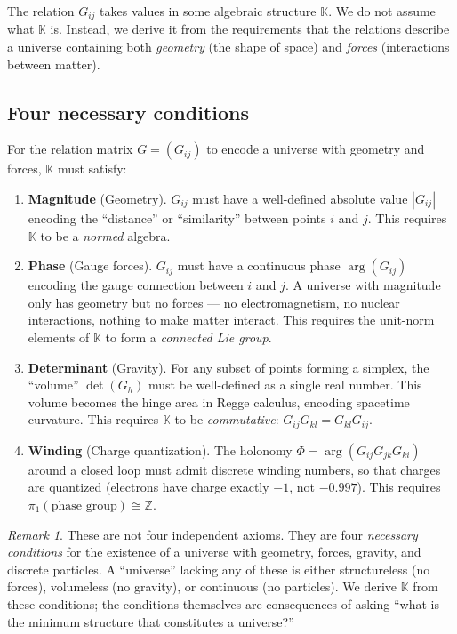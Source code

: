 \documentclass[12pt]{article}
\theoremstyle{remark}
\newtheorem{remark}[theorem]{Remark}
\theoremstyle{definition}
\begin{document}
The relation $G_{ij}$ takes values in some algebraic structure $\mathbb{K}$. We do not assume what $\mathbb{K}$ is. Instead, we derive it from the requirements that the relations describe a universe containing both \emph{geometry} (the shape of space) and \emph{forces} (interactions between matter).

\subsection{Four necessary conditions}

For the relation matrix $G = (G_{ij})$ to encode a universe with geometry and forces, $\mathbb{K}$ must satisfy:

\begin{enumerate}[label=\textbf{R\arabic*.}, leftmargin=2cm]
\item \textbf{Magnitude} (Geometry). $G_{ij}$ must have a well-defined absolute value $|G_{ij}|$ encoding the ``distance'' or ``similarity'' between points $i$ and $j$. This requires $\mathbb{K}$ to be a \emph{normed} algebra.

\item \textbf{Phase} (Gauge forces). $G_{ij}$ must have a continuous phase $\arg(G_{ij})$ encoding the gauge connection between $i$ and $j$. A universe with magnitude only has geometry but no forces --- no electromagnetism, no nuclear interactions, nothing to make matter interact. This requires the unit-norm elements of $\mathbb{K}$ to form a \emph{connected Lie group}.

\item \textbf{Determinant} (Gravity). For any subset of points forming a simplex, the ``volume'' $\det(G_h)$ must be well-defined as a single real number. This volume becomes the hinge area in Regge calculus, encoding spacetime curvature. This requires $\mathbb{K}$ to be \emph{commutative}: $G_{ij} G_{kl} = G_{kl} G_{ij}$.

\item \textbf{Winding} (Charge quantization). The holonomy $\Phi = \arg(G_{ij} G_{jk} G_{ki})$ around a closed loop must admit discrete winding numbers, so that charges are quantized (electrons have charge exactly $-1$, not $-0.997$). This requires $\pi_1(\text{phase group}) \cong \mathbb{Z}$.
\end{enumerate}

\begin{remark}
These are not four independent axioms. They are four \emph{necessary conditions} for the existence of a universe with geometry, forces, gravity, and discrete particles. A ``universe'' lacking any of these is either structureless (no forces), volumeless (no gravity), or continuous (no particles). We derive $\mathbb{K}$ from these conditions; the conditions themselves are consequences of asking ``what is the minimum structure that constitutes a universe?''
\end{remark}
\end{document}
